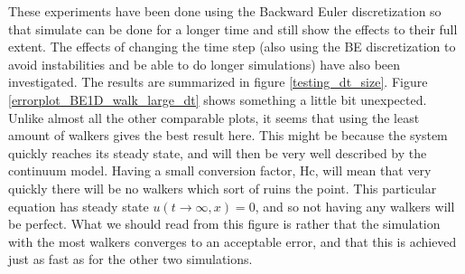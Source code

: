 These experiments have been done using the Backward Euler discretization so that simulate can be done for a longer time and still show the effects to their full extent. 
The effects of changing the time step (also using the BE discretization to avoid instabilities and be able to do longer simulations) have also been investigated. 
The results are summarized in figure \ref{testing_dt_size}. 
Figure \ref{errorplot_BE1D_walk_large_dt} shows something a little bit unexpected. 
Unlike almost all the other comparable plots, it seems that using the least amount of walkers gives the best result here. 
This might be because the system quickly reaches its steady state, and will then be very well described by the continuum model. 
Having a small conversion factor, Hc, will mean that very quickly there will be no walkers which sort of ruins the point. 
This particular equation has steady state $u(t\to\infty,x) = 0$, and so not having any walkers will be perfect. 
What we should read from this figure is rather that the simulation with the most walkers converges to an acceptable error, and that this is achieved just as fast as for the other two simulations.



